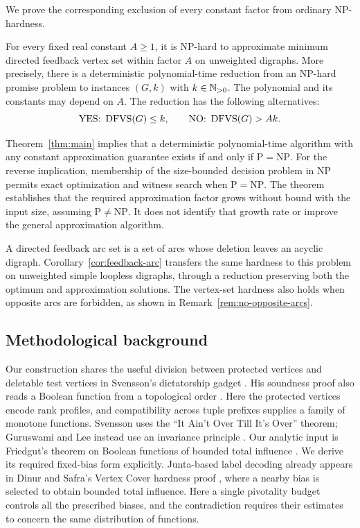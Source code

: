 We prove the corresponding exclusion of every constant factor from
ordinary NP-hardness.

\begin{theorem}\label{thm:main}
For every fixed real constant $A\ge1$, it is NP-hard to approximate
minimum directed feedback vertex set within factor $A$ on unweighted
digraphs. More precisely, there is a deterministic polynomial-time
reduction from an NP-hard promise problem to instances $(G,k)$ with
$k\in\mathbb N_{>0}$. The polynomial and its constants may depend on $A$.
The reduction has the following alternatives:
\[
  \textnormal{YES: }\operatorname{DFVS}(G)\le k,
  \qquad
  \textnormal{NO: }\operatorname{DFVS}(G)>Ak.
\]
\end{theorem}

Theorem~\ref{thm:main} implies that a deterministic polynomial-time
algorithm with any constant approximation guarantee exists if and
only if $\mathrm P=\mathrm{NP}$. For the reverse implication, membership
of the size-bounded decision problem in NP permits exact optimization
and witness search when $\mathrm P=\mathrm{NP}$. The theorem establishes
that the required approximation factor grows without bound with the
input size, assuming $\mathrm P\ne\mathrm{NP}$. It does not identify
that growth rate or improve the general approximation algorithm.

A directed feedback arc set is a set of arcs whose deletion leaves an
acyclic digraph. Corollary~\ref{cor:feedback-arc} transfers the same
hardness to this problem on unweighted simple loopless digraphs, through
a reduction preserving both the optimum and approximation solutions.
The vertex-set hardness also holds when opposite arcs are forbidden,
as shown in Remark~\ref{rem:no-opposite-arcs}.

\subsection{Methodological background}

Our construction shares the useful division between protected vertices
and deletable test vertices in Svensson's dictatorship gadget
\cite[Section~3.1.1]{Svensson2013}. His soundness proof also reads a
Boolean function from a topological order
\cite[Section~3.1.3]{Svensson2013}. Here the protected vertices encode
rank profiles, and compatibility across tuple prefixes supplies a
family of monotone functions. Svensson uses the ``It Ain't Over Till
It's Over'' theorem; Guruswami and Lee instead use an invariance
principle \cite[Section~1]{GuruswamiLee2016}. Our analytic input is
Friedgut's theorem on Boolean functions of bounded total influence
\cite{Friedgut1998}. We derive its required fixed-bias form explicitly.
Junta-based label decoding already appears in Dinur and Safra's
Vertex Cover hardness proof \cite[Sections~1.1 and~3]{DinurSafra2005},
where a nearby bias is selected to obtain bounded total influence.
Here a single pivotality budget controls all the prescribed biases,
and the contradiction requires their estimates to concern the same
distribution of functions.

